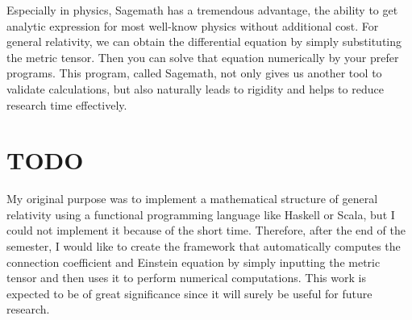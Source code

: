 \documentclass[%
 reprint,
 amsmath,amssymb,
 aps,
]{revtex4-1}
\begin{document}
Especially in physics, Sagemath has a tremendous advantage,
the ability to get analytic expression for most well-know physics without
additional cost. For general relativity, we can obtain the differential equation
by simply substituting the metric tensor. Then you can solve that equation
numerically by your prefer programs. This program, called Sagemath, not only
gives us another tool to validate calculations, but also naturally leads to
rigidity and helps to reduce research time effectively.

\VS


\section{TODO}

My original purpose was to implement a mathematical structure of general
relativity using a functional programming language like Haskell or Scala, but I
could not implement it because of the short time. Therefore, after the end of the
semester, I would like to create the framework that automatically computes the
connection coefficient and Einstein equation by simply inputting the metric
tensor and then uses it to perform numerical computations. This work is expected
to be of great significance since it will surely be useful for future research. 

\appendix


\end{document}
